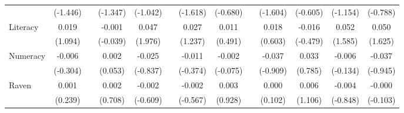 \begin{table}[htbp]
{\begin{tabular}{lcccccccccccc}
          & (-1.446) &       & (-1.347) & (-1.042) &       & (-1.618) & (-0.680) &       & (-1.604) & (-0.605) & (-1.154) & (-0.788) \\
    Literacy & 0.019 &       & -0.001 & \cellcolor[rgb]{ 1,  1,  0}0.047 &       & 0.027 & 0.011 &       & 0.018 & -0.016 & 0.052 & 0.050 \\
          & (1.094) &       & (-0.039) & (1.976) &       & (1.237) & (0.491) &       & (0.603) & (-0.479) & (1.585) & (1.625) \\
    Numeracy & -0.006 &       & 0.002 & -0.025 &       & -0.011 & -0.002 &       & -0.037 & 0.033 & -0.006 & -0.037 \\
          & (-0.304) &       & (0.053) & (-0.837) &       & (-0.374) & (-0.075) &       & (-0.909) & (0.785) & (-0.134) & (-0.945) \\
    Raven & 0.001 &       & 0.002 & -0.002 &       & -0.002 & 0.003 &       & 0.000 & 0.006 & -0.004 & -0.000 \\
          & (0.239) &       & (0.708) & (-0.609) &       & (-0.567) & (0.928) &       & (0.102) & (1.106) & (-0.848) & (-0.103) \\


\end{tabular}}
\end{table}
